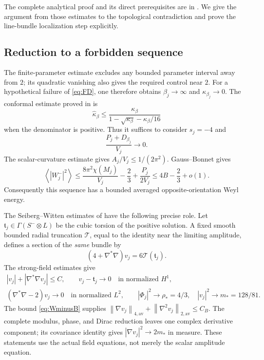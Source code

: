 \documentclass[11pt,a4paper]{article}
\theoremstyle{definition}
\theoremstyle{remark}
\newcommand{\norm}[1]{\left\lVert#1\right\rVert}
\newcommand{\av}[1]{\left\langle#1\right\rangle}
\begin{document}
The complete analytical proof and its direct prerequisites are in \cite{FDcomplete,FD,FDstrong,FDresolvent,FDweak}. We give the argument from those estimates to the topological contradiction and prove the line-bundle localization step explicitly.

\subsection{Reduction to a forbidden sequence}
The finite-parameter estimate excludes any bounded parameter interval away from $2$; its quadratic vanishing also gives the required control near $2$. For a hypothetical failure of \eqref{eq:FD}, one therefore obtains $\beta_j\to\infty$ and $\kappa_{\beta_j}\to0$. The conformal estimate proved in \cite{FDcomplete} is
\begin{equation}
 \widehat\kappa_\beta\le
 \frac{\kappa_\beta}{1-\sqrt{\kappa_\beta}-\kappa_\beta/16}
 \label{eq:kappaconformal}
\end{equation}
when the denominator is positive. Thus it suffices to consider $s_j=-4$ and
\begin{equation}
 \frac{P_j+D_{\beta_j}}{V_j}\longrightarrow0.
 \label{eq:zeroend}
\end{equation}
The scalar-curvature estimate gives $A_j/V_j\le1/(2\pi^2)$. Gauss--Bonnet gives
\begin{equation}
 \av{|W_j^-|^2}\le\frac{8\pi^2\chi(M_j)}{V_j}-\frac23+\frac{P_j}{2V_j}
 \le4B-\frac23+o(1).
 \label{eq:WminusB}
\end{equation}
Consequently this sequence has a bounded averaged opposite-orientation Weyl energy.

The Seiberg--Witten estimates of \cite{FDstrong,FDresolvent,FDweak} have the following precise role. Let $\mathfrak t_j\in\Gamma(S^-\otimes L)$ be the cubic torsion of the positive solution. A fixed smooth bounded radial truncation $\mathcal T$, equal to the identity near the limiting amplitude, defines a section of the \emph{same} bundle by
\[
 (4+\nabla^*\nabla)v_j=6\mathcal T(\mathfrak t_j).
\]
The strong-field estimates give
\begin{gather}
 |v_j|+|\nabla^*\nabla v_j|\le C,\qquad
 v_j-\mathfrak t_j\to0\quad\text{in normalized }H^1,\nonumber\\
 (\nabla^*\nabla-2)v_j\to0\quad\text{in normalized }L^2,
 \qquad |\Phi_j|^2\to\rho_*=4/3,\quad |v_j|^2\to m_*=128/81.
 \label{eq:vlimits}
\end{gather}
The bound \eqref{eq:WminusB} supplies $\norm{\nabla v_j}_{4,\mathrm{av}}+\norm{\nabla^2v_j}_{2,\mathrm{av}}\le C_B$. The complete modulus, phase, and Dirac reduction leaves one complex derivative component; its covariance identity gives $|\nabla v_j|^2\to2m_*$ in measure. These statements use the actual field equations, not merely the scalar amplitude equation.
\end{document}
